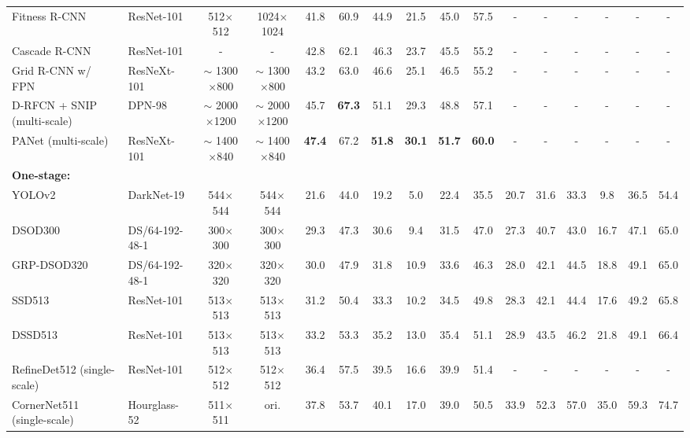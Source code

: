 \documentclass[10pt,twocolumn,letterpaper]{article}
\begin{document}
\begin{table*}[tb]
{\begin{tabular}{|l|l|cc|cccccc|cccccc|}
Fitness R-CNN~\cite{tychsen2018improving} & ResNet-101 & 512$\times$512 & 1024$\times$1024 & 41.8 & 60.9 & 44.9 & 21.5 & 45.0 & 57.5 & - & - & - & - & - & - \\
Cascade R-CNN~\cite{cai2018cascade} & ResNet-101 & - & - & 42.8 & 62.1 & 46.3 & 23.7 & 45.5 & 55.2 & - & - & - & - & - & - \\
Grid R-CNN w/ FPN~\cite{Lu2018Grid} & ResNeXt-101 & $\sim$ 1300$\times$800 & $\sim$ 1300$\times$800 & 43.2 & 63.0 & 46.6 & 25.1 & 46.5 & 55.2 & - & - & - & - & - & - \\
D-RFCN + SNIP (multi-scale)~\cite{singh2018analysis} & DPN-98~\cite{chen2017dual} & $\sim$ 2000$\times$1200 & $\sim$ 2000$\times$1200 & 45.7 & \textbf{67.3} & 51.1 & 29.3 & 48.8 & 57.1 & - & - & - & - & - & - \\
PANet (multi-scale)~\cite{liu2018path} & ResNeXt-101 & $\sim$ 1400$\times$840 & $\sim$ 1400$\times$840 & \textbf{47.4} & 67.2 & \textbf{51.8} & \textbf{30.1} & \textbf{51.7} & \textbf{60.0} & - & - & - & - & - & - \\
\hline
\hline
\textbf{One-stage:} & & & & & & & & & & & & & & &\\
YOLOv2~\cite{redmon2017yolo9000} & DarkNet-19 & 544$\times$544 & 544$\times$544 & 21.6 & 44.0 & 19.2 & 5.0 & 22.4 & 35.5 & 20.7 & 31.6 & 33.3 & 9.8 & 36.5 & 54.4 \\
DSOD300~\cite{shen2017dsod} & DS/64-192-48-1 & 300$\times$300 & 300$\times$300 & 29.3 & 47.3 & 30.6 & 9.4 & 31.5 & 47.0 & 27.3 & 40.7 & 43.0 & 16.7 & 47.1 & 65.0 \\
GRP-DSOD320~\cite{shen2017learning} & DS/64-192-48-1 & 320$\times$320 & 320$\times$320 & 30.0 & 47.9 & 31.8 & 10.9 & 33.6 & 46.3 & 28.0 & 42.1 & 44.5 & 18.8 & 49.1 & 65.0 \\
SSD513~\cite{liu2016ssd} & ResNet-101 & 513$\times$513 & 513$\times$513 & 31.2 & 50.4 & 33.3 & 10.2 & 34.5 & 49.8 & 28.3 & 42.1 & 44.4 & 17.6 & 49.2 & 65.8 \\
DSSD513~\cite{fu2017dssd} & ResNet-101 & 513$\times$513 & 513$\times$513 & 33.2 & 53.3 & 35.2 & 13.0 & 35.4 & 51.1 & 28.9 & 43.5 & 46.2 & 21.8 & 49.1 & 66.4 \\
RefineDet512 (single-scale)~\cite{zhang2018single} & ResNet-101 & 512$\times$512 & 512$\times$512 & 36.4 & 57.5 & 39.5 & 16.6 & 39.9 & 51.4 & - & - & - & - & - & - \\
CornerNet511 (single-scale)~\cite{law2018cornernet} & Hourglass-52 & 511$\times$511 & ori. & 37.8 & 53.7 & 40.1 & 17.0 & 39.0 & 50.5 & 33.9 & 52.3 & 57.0 & 35.0 & 59.3 & 74.7 \\

\end{tabular}}
\end{table*}
\end{document}

